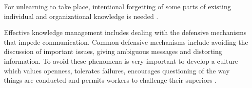 For unlearning to take place, intentional forgetting of some parts of existing individual and organizational knowledge is needed \citep{rebernik2007fostering}.

Effective knowledge management includes dealing with the defensive mechanisms that impede communication. Common defensive mechanisms include avoiding the discussion of important issues, giving ambiguous messages and distorting information. To avoid these phenomena is very important to develop a culture which values openness, tolerates failures, encourages questioning of the way things are conducted and permits workers to challenge their superiors \citep{lubit2001keys}.

